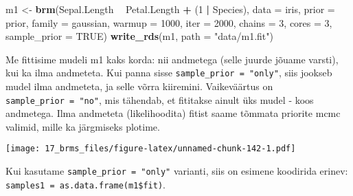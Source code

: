 \documentclass[]{article}
\newenvironment{Shaded}{\begin{snugshade}}{\end{snugshade}}
\newcommand{\KeywordTok}[1]{\textcolor[rgb]{0.13,0.29,0.53}{\textbf{#1}}}
\newcommand{\DataTypeTok}[1]{\textcolor[rgb]{0.13,0.29,0.53}{#1}}
\newcommand{\DecValTok}[1]{\textcolor[rgb]{0.00,0.00,0.81}{#1}}
\newcommand{\StringTok}[1]{\textcolor[rgb]{0.31,0.60,0.02}{#1}}
\newcommand{\OtherTok}[1]{\textcolor[rgb]{0.56,0.35,0.01}{#1}}
\newcommand{\OperatorTok}[1]{\textcolor[rgb]{0.81,0.36,0.00}{\textbf{#1}}}
\newcommand{\NormalTok}[1]{#1}
\begin{document}
\begin{Shaded}
\begin{Highlighting}[]
\NormalTok{m1 <-}\StringTok{ }\KeywordTok{brm}\NormalTok{(Sepal.Length }\OperatorTok{~}\StringTok{ }\NormalTok{Petal.Length }\OperatorTok{+}\StringTok{ }\NormalTok{(}\DecValTok{1} \OperatorTok{|}\StringTok{ }\NormalTok{Species), }
          \DataTypeTok{data =}\NormalTok{ iris, }
          \DataTypeTok{prior =}\NormalTok{ prior, }
          \DataTypeTok{family =}\NormalTok{ gaussian,}
          \DataTypeTok{warmup =} \DecValTok{1000}\NormalTok{,}
          \DataTypeTok{iter =} \DecValTok{2000}\NormalTok{,}
          \DataTypeTok{chains =} \DecValTok{3}\NormalTok{,}
          \DataTypeTok{cores =} \DecValTok{3}\NormalTok{,}
          \DataTypeTok{sample_prior =} \OtherTok{TRUE}\NormalTok{)}
\KeywordTok{write_rds}\NormalTok{(m1, }\DataTypeTok{path =} \StringTok{"data/m1.fit"}\NormalTok{)}
\end{Highlighting}
\end{Shaded}

Me fittisime mudeli m1 kaks korda: nii andmetega (selle juurde jõuame
varsti), kui ka ilma andmeteta. Kui panna sisse
\texttt{sample\_prior\ =\ "only"}, siis jookseb mudel ilma andmeteta, ja
selle võrra kiiremini. Vaikeväärtus on \texttt{sample\_prior\ =\ "no"},
mis tähendab, et fititakse ainult üks mudel - koos andmetega. Ilma
andmeteta (likelihoodita) fitist saame tõmmata priorite mcmc valimid,
mille ka järgmiseks plotime.

\begin{Shaded}
\end{Shaded}

\texttt{[image: 17\_brms\_files/figure-latex/unnamed-chunk-142-1.pdf]}

Kui kasutame \texttt{sample\_prior\ =\ "only"} varianti, siis on esimene
koodirida erinev: \texttt{samples1\ =\ as.data.frame(m1\$fit)}.
\end{document}
